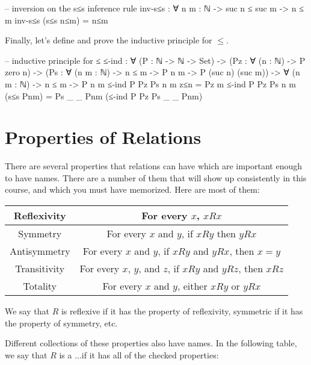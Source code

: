 \documentclass{lecturenotes}
\begin{document}
\begin{center}
\begin{code}
-- inversion on the s≤s inference rule
inv-s≤s : ∀ {n m : ℕ} -> suc n ≤ suc m -> n ≤ m
inv-s≤s (s≤s n≤m) = n≤m
\end{code}
\end{center}

Finally, let's define and prove the inductive principle for $\le$.

\begin{center}
\begin{code}
-- inductive principle for ≤
≤-ind : ∀ (P : ℕ -> ℕ -> Set) ->
  (Pz : ∀ (n : ℕ) -> P zero n) ->
  (Ps : ∀ (n m : ℕ) -> n ≤ m -> P n m -> P (suc n) (suc m)) ->
  ∀ (n m : ℕ) -> n ≤ m -> P n m
≤-ind P Pz Ps n m z≤n = Pz m
≤-ind P Pz Ps n m (s≤s Pnm) = Ps _ _ Pnm (≤-ind P Pz Ps _ _ Pnm)
\end{code}
\end{center}

\section{Properties of Relations}

There are several properties that relations can have which are important enough to have names.
There are a number of them that will show up consistently in this course, and which you must have memorized.
Here are most of them:

\begin{center}
\begin{tabular}{|c | c|}
  \hline
  Reflexivity & For every $x$, $x R x$ \\
  \hline
  Symmetry & For every $x$ and $y$, if $x R y$ then $y R x$ \\
  \hline
  Antisymmetry & For every $x$ and $y$, if $x R y$ and $y R x$, then $x = y$ \\
  \hline
  Transitivity & For every $x$, $y$, and $z$, if $x R y$ and $y R z$, then $x R z$ \\
  \hline
  Totality & For every $x$ and $y$, either $x R y$ or $y R x$ \\
  \hline
\end{tabular}
\end{center}

We say that $R$ is reflexive if it has the property of reflexivity, symmetric if it has the property of symmetry, etc.

Different collections of these properties also have names.
In the following table, we say that $R$ is a ...if it has all of the checked properties:
\end{document}
